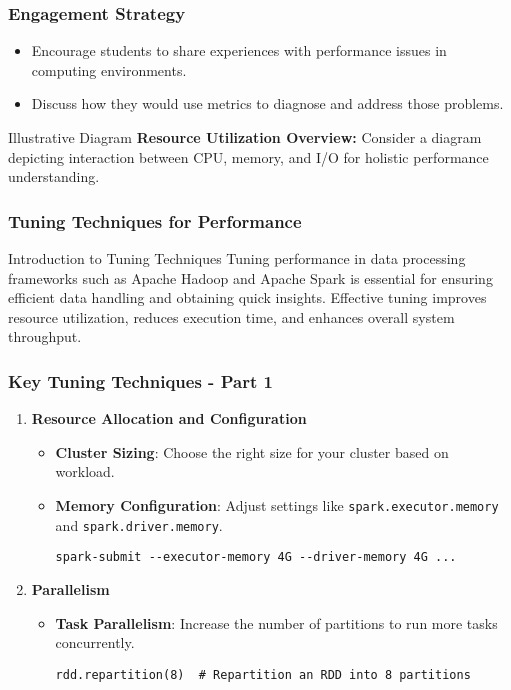 \documentclass[aspectratio=169]{beamer}
\begin{document}
\begin{frame}[fragile]
    \frametitle{Engagement Strategy}
    \begin{itemize}
        \item Encourage students to share experiences with performance issues in computing environments.
        \item Discuss how they would use metrics to diagnose and address those problems.
    \end{itemize}
    
    \begin{block}{Illustrative Diagram}
        \textbf{Resource Utilization Overview:} Consider a diagram depicting interaction between CPU, memory, and I/O for holistic performance understanding.
    \end{block}
\end{frame}

\begin{frame}[fragile]
    \frametitle{Tuning Techniques for Performance}
    \begin{block}{Introduction to Tuning Techniques}
        Tuning performance in data processing frameworks such as Apache Hadoop and Apache Spark is essential for ensuring efficient data handling and obtaining quick insights. Effective tuning improves resource utilization, reduces execution time, and enhances overall system throughput.
    \end{block}
\end{frame}

\begin{frame}[fragile]
    \frametitle{Key Tuning Techniques - Part 1}
    \begin{enumerate}
        \item \textbf{Resource Allocation and Configuration}
        \begin{itemize}
            \item \textbf{Cluster Sizing}: Choose the right size for your cluster based on workload.
            \item \textbf{Memory Configuration}: Adjust settings like \texttt{spark.executor.memory} and \texttt{spark.driver.memory}.
            \begin{lstlisting}
spark-submit --executor-memory 4G --driver-memory 4G ...
            \end{lstlisting}
        \end{itemize}

        \item \textbf{Parallelism}
        \begin{itemize}
            \item \textbf{Task Parallelism}: Increase the number of partitions to run more tasks concurrently.
            \begin{lstlisting}
rdd.repartition(8)  # Repartition an RDD into 8 partitions
            \end{lstlisting}
        \end{itemize}
    \end{enumerate}
\end{frame}
\end{document}
